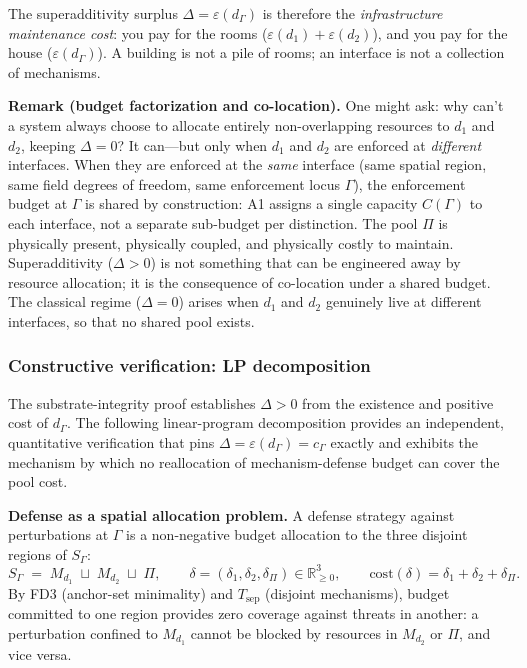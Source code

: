 \documentclass[11pt]{article}
\theoremstyle{remark}
\begin{document}
The superadditivity surplus $\Delta = \varepsilon(d_\Gamma)$ is therefore the \emph{infrastructure maintenance cost}: you pay for the rooms ($\varepsilon(d_1) + \varepsilon(d_2)$), and you pay for the house ($\varepsilon(d_\Gamma)$).  A building is not a pile of rooms; an interface is not a collection of mechanisms.

\smallskip\noindent\textbf{Remark (budget factorization and co-location).}  One might ask: why can't a system always choose to allocate entirely non-overlapping resources to $d_1$ and $d_2$, keeping $\Delta = 0$?  It can---but only when $d_1$ and $d_2$ are enforced at \emph{different} interfaces.  When they are enforced at the \emph{same} interface (same spatial region, same field degrees of freedom, same enforcement locus $\Gamma$), the enforcement budget at $\Gamma$ is shared by construction: A1 assigns a single capacity $C(\Gamma)$ to each interface, not a separate sub-budget per distinction.  The pool $\Pi$ is physically present, physically coupled, and physically costly to maintain.  Superadditivity ($\Delta > 0$) is not something that can be engineered away by resource allocation; it is the consequence of co-location under a shared budget.  The classical regime ($\Delta = 0$) arises when $d_1$ and $d_2$ genuinely live at different interfaces, so that no shared pool exists.


\subsubsection*{Constructive verification: LP decomposition}
\label{sec:LP_verification}

The substrate-integrity proof establishes $\Delta > 0$ from the existence and positive cost of $d_\Gamma$.  The following linear-program decomposition provides an independent, quantitative verification that pins $\Delta = \varepsilon(d_\Gamma) = c_\Gamma$ exactly and exhibits the mechanism by which no reallocation of mechanism-defense budget can cover the pool cost.

\textbf{Defense as a spatial allocation problem.}  A defense strategy against perturbations at $\Gamma$ is a non-negative budget allocation to the three disjoint regions of $S_\Gamma$:
\[
S_\Gamma \;=\; M_{d_1} \;\sqcup\; M_{d_2} \;\sqcup\; \Pi, \qquad \delta = (\delta_1, \delta_2, \delta_\Pi) \in \mathbb{R}_{\ge 0}^3, \qquad \mathrm{cost}(\delta) = \delta_1 + \delta_2 + \delta_\Pi.
\]
By FD3 (anchor-set minimality) and $T_{\mathrm{sep}}$ (disjoint mechanisms), budget committed to one region provides zero coverage against threats in another: a perturbation confined to $M_{d_1}$ cannot be blocked by resources in $M_{d_2}$ or $\Pi$, and vice versa.
\end{document}
